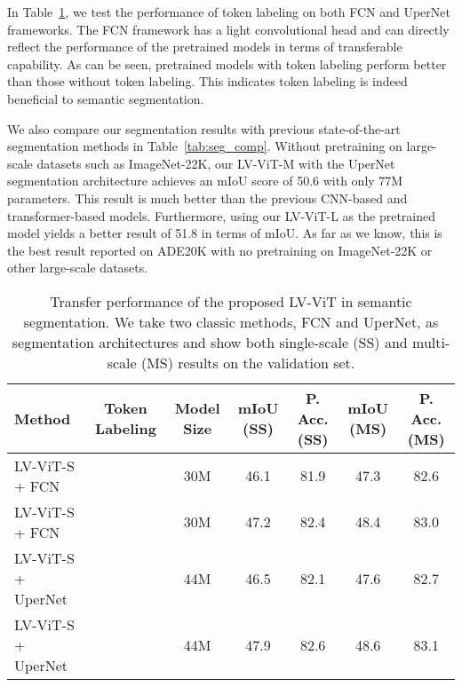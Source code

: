 \documentclass{article}
\newcommand{\cmark}{\ding{51}}\newcommand{\xmark}{\ding{55}}
\newcommand{\nameofmethod}{LV-ViT}
\begin{document}
In Table~\ref{tab:seg_abl}, we test the performance of token labeling on both FCN and UperNet frameworks.
The FCN framework has a light convolutional head and can
directly reflect the performance of the pretrained models
in terms of transferable capability.
As can be seen, pretrained models with token labeling perform better than
those without token labeling.
This indicates token labeling is indeed beneficial to semantic segmentation.



We also compare our segmentation results with previous state-of-the-art 
segmentation methods in Table~\ref{tab:seg_comp}.
Without pretraining on large-scale datasets such as ImageNet-22K, our \nameofmethod{}-M with the UperNet segmentation architecture achieves an mIoU score of 50.6 with
only 77M parameters.
This result is much better than the previous CNN-based and transformer-based models.
Furthermore, using our \nameofmethod{}-L as the pretrained model yields a better
result of 51.8 in terms of mIoU.
As far as we know, this is the best result reported on ADE20K with no pretraining
on ImageNet-22K or other large-scale datasets.

\begin{table}[t]
  \centering
  \small
  \setlength\tabcolsep{1.1mm}
  \renewcommand\arraystretch{1.2}
  \caption{Transfer performance of the proposed \nameofmethod{} in semantic segmentation.
  We take two classic methods,
  FCN and UperNet, as segmentation architectures and show both single-scale (SS) and multi-scale (MS) results on the validation set.}
  \label{tab:seg_abl}
  \begin{tabular}{lcccccc} \toprule[0.5pt]
    Method & Token Labeling & Model Size & mIoU (SS) & P. Acc. (SS) & mIoU (MS) & P. Acc. (MS) \\ \midrule[0.5pt] \midrule[0.5pt]
    \nameofmethod{}-S + FCN & \xmark & 30M & 46.1 & 81.9 &  47.3 & 82.6 \\
    \nameofmethod{}-S + FCN & \cmark & 30M & 47.2 & 82.4 & 48.4 & 83.0  \\ \midrule[0.5pt]
    \nameofmethod{}-S + UperNet & \xmark & 44M & 46.5 & 82.1 &  47.6 & 82.7\\
    \nameofmethod{}-S + UperNet & \cmark & 44M & 47.9 & 82.6 & 48.6 & 83.1 \\
    \bottomrule[0.5pt]
  \end{tabular}
\end{table}
\end{document}
